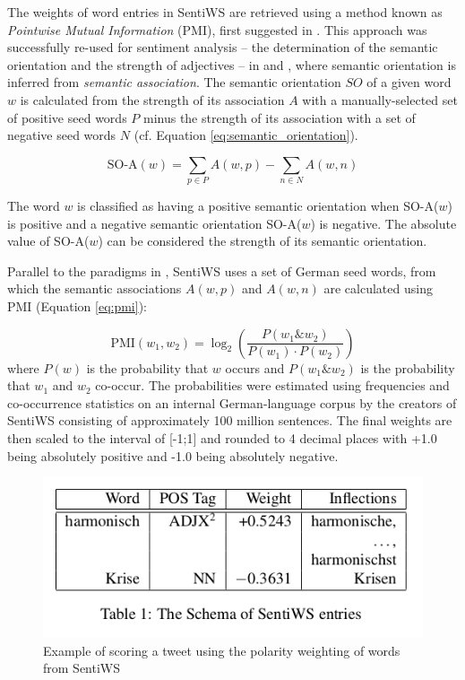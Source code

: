 \documentclass[12pt,onecolumn,twoside]{layout}
\begin{document}
The weights of word entries in SentiWS are retrieved using a method known as \emph{Pointwise Mutual Information} (PMI), first suggested in \cite{church-hanks-1990-word}. This approach was successfully re-used for sentiment analysis -- the determination of the semantic orientation and the strength of adjectives -- in \cite{Turney2002} and \cite{Turney2003}, where semantic orientation is inferred from \emph{semantic association}. The semantic orientation \(SO\) of a given word \(w\) is calculated from the strength of its association \(A\) with a manually-selected set of positive seed words \(P\) minus the strength of its association with a set of negative seed words \(N\) (cf. Equation \ref{eq:semantic_orientation}). 

\begin{equation}
\label{eq:semantic_orientation}
\text{SO-A}(w) = \sum_{p \in P}A(w,p) - \sum_{n \in N}A(w,n)
\end{equation}

The word \(w\) is classified as having a positive semantic orientation when SO-A(\(w\)) is positive and a negative semantic orientation SO-A(\(w\)) is negative. The absolute value of SO-A(\(w\)) can be considered the strength of its semantic orientation. 

Parallel to the paradigms in \cite{Turney2003}, SentiWS uses a set of German seed words, from which the semantic associations \(A(w,p)\) and \(A(w,n)\) are calculated using PMI (Equation \ref{eq:pmi}): 

\begin{equation}
\label{eq:pmi}
\text{PMI}(w_1,w_2) = \log_2\left(\frac{P(w_1 \& w_2)}{P(w_1) \cdot P(w_2)}\right)
\end{equation}
where \(P(w)\) is the probability that \(w\) occurs and \(P(w_1 \& w_2)\) is the probability that \(w_1\) and \(w_2\) co-occur. The probabilities were estimated using frequencies and co-occurrence statistics on an internal German-language corpus by the creators of SentiWS consisting of approximately 100 million sentences. The final weights are then scaled to the interval of [-1;1] and rounded to 4 decimal places with +1.0 being absolutely positive and -1.0 being absolutely negative.

\begin{figure} 
	\begin{center}
		\includegraphics[width=0.5\linewidth]{figures/sentiws_example}
	\end{center}
	\caption{Example of scoring a tweet using the polarity weighting of words from SentiWS}
	\label{fig:sentiws_example}
\end{figure}
\end{document}

